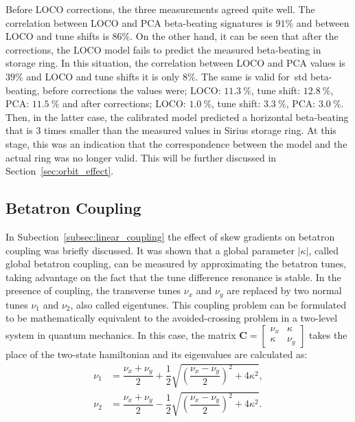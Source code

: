 Before LOCO corrections, the three measurements agreed quite well. The correlation between LOCO and PCA beta-beating signatures is $91\%$ and between LOCO and tune shifts is $86\%$. On the other hand, it can be seen that after the corrections, the LOCO model fails to predict the measured beta-beating in storage ring. In this situation, the correlation between LOCO and PCA values is $39\%$ and LOCO and tune shifts it is only $8\%$. The same is valid for~\gls{std} beta-beating, before corrections the values were; LOCO: $\SI{11.3}{\%}$, tune shift: $\SI{12.8}{\%}$, PCA: $\SI{11.5}{\%}$ and after corrections; LOCO: $\SI{1.0}{\%}$, tune shift: $\SI{3.3}{\%}$, PCA: $\SI{3.0}{\%}$. Then, in the latter case, the calibrated model predicted a horizontal beta-beating that is 3 times smaller than the measured values in Sirius storage ring. At this stage, this was an indication that the correspondence between the model and the actual ring was no longer valid. This will be further discussed in Section~\ref{sec:orbit_effect}.

\subsection{Betatron Coupling}
In Subection~\ref{subsec:linear_coupling} the effect of skew gradients on betatron coupling was briefly discussed. It was shown that a global parameter $|\kappa|$, called global betatron coupling, can be measured by approximating the betatron tunes, taking advantage on the fact that the tune difference resonance is stable. In the presence of coupling, the transverse tunes $\nu_x$ and $\nu_y$ are replaced by two normal tunes $\nu_1$ and $\nu_2$, also called eigentunes. This coupling problem can be formulated to be mathematically equivalent to the avoided-crossing problem in a two-level system in quantum mechanics. In this case, the matrix $\mathbf{C} = \begin{bmatrix} \nu_x & \kappa \\ \kappa & \nu_y \end{bmatrix}$ takes the place of the two-state hamiltonian and its eigenvalues are calculated as:
\begin{align}
    \nu_1 &= \dfrac{\nu_x + \nu_y}{2} + \dfrac{1}{2}\sqrt{\left(\dfrac{\nu_x - \nu_y}{2}\right)^2 + 4 \kappa^2}, \\
    \nu_2 &= \dfrac{\nu_x + \nu_y}{2} - \dfrac{1}{2}\sqrt{\left(\dfrac{\nu_x - \nu_y}{2}\right)^2 + 4 \kappa^2}.
    \label{eq:normal_tunes}
\end{align}

